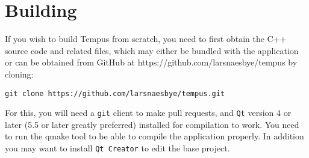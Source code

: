 \section{Building}

If you wish to build Tempus from scratch, you need to first obtain the C++ source code and related files, which may either be bundled with the application or can be obtained from GitHub at https://github.com/larsnaesbye/tempus by cloning:

\texttt{git clone https://github.com/larsnaesbye/tempus.git}

For this, you will need a \texttt{git} client to make pull requests, and \texttt{Qt} version 4 or later (5.5 or later greatly preferred) installed for compilation to work. 
You need to run the qmake tool to be able to compile the application properly.
In addition you may want to install \texttt{Qt Creator} to edit the base project.
